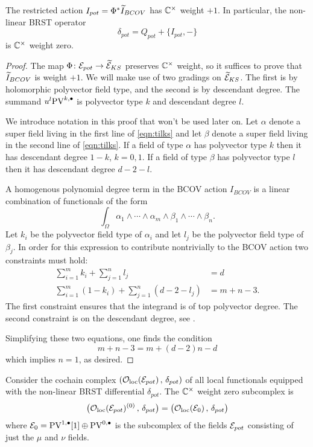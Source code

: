 \documentclass[11pt]{amsart}
\begin{document}
\begin{lem}
The restricted action $I_{pot} = \Phi^* \widetilde{I}_{BCOV}$ has $\mathbb C^\times$ weight $+1$. 
In particular, the non-linear BRST operator 
\[
\delta_{pot} = Q_{pot} + \{I_{pot},-\}
\]
is $\mathbb C^\times$ weight zero.
\end{lem}
\begin{proof}
The map $\Phi \colon \mathcal E_{pot} \to \widetilde{\mathcal E}_{KS}$ preserves $\mathbb C^\times$ weight, so it suffices to prove that $\widetilde{I}_{BCOV}$ is weight $+1$. 
We will make use of two gradings on $\widetilde{\mathcal E}_{KS}$. 
The first is by holomorphic polyvector field type, and the second is by descendant degree.
The summand $u^l {\rm PV}^{k,\bullet}$ is polyvector type $k$ and descendant degree $l$. 

We introduce notation in this proof that won't be used later on. 
Let $\alpha$ denote a super field living in the first line of \eqref{eqn:tilks} and let $\beta$ denote a super field living in the second line of \eqref{eqn:tilks}.
If a field of type $\alpha$ has polyvector type $k$ then it has descendant degree $1-k$, $k=0,1$. 
If a field of type $\beta$ has polyvector type $l$ then it has descendant degree $d-2-l$.

A homogenous polynomial degree term in the BCOV action $I_{BCOV}$ is a linear combination of functionals of the form
\[
\int_\Omega \alpha_1 \wedge \cdots \wedge \alpha_m \wedge \beta_1 \wedge \cdots \wedge \beta_n  .
\]
Let $k_i$ be the polyvector field type of $\alpha_i$ and let $l_j$ be the polyvector field type of $\beta_j$. 
In order for this expression to contribute nontrivially to the BCOV action two constraints must hold:
\begin{align*}
\sum_{i=1}^m k_i + \sum_{j=1}^n l_j & = d \\
\sum_{i=1}^m (1-k_i) + \sum_{j=1}^n (d-2-l_j) & = m+n-3 .
\end{align*}
The first constraint ensures that the integrand is of top polyvector degree. 
The second constraint is on the descendant degree, see . 

Simplifying these two equations, one finds the condition
\[
m+n-3 = m+(d-2)n - d 
\]
which implies $n=1$, as desired. 
\end{proof}

Consider the cochain complex $\left({\mathcal O}_{\rm loc}(\mathcal E_{pot}) \, , \, \delta_{pot} \right)$ of all local functionals equipped with the non-linear BRST differential $\delta_{pot}$. 
The $\mathbb C^\times$ weight zero subcomplex is 
\[
\big({\mathcal O}_{\rm loc}(\mathcal E_{pot})^{(0)} \, , \, \delta_{pot} \big) = \big({\mathcal O}_{\rm loc}(\mathcal E_0) \, , \, \delta_{pot} \big) 
\]
where $\mathcal E_0 = {\rm PV}^{1,\bullet}[1] \oplus {\rm PV}^{0,\bullet}$ is the subcomplex of the fields $\mathcal E_{pot}$ consisting of just the $\mu$ and $\nu$ fields.
\end{document}
